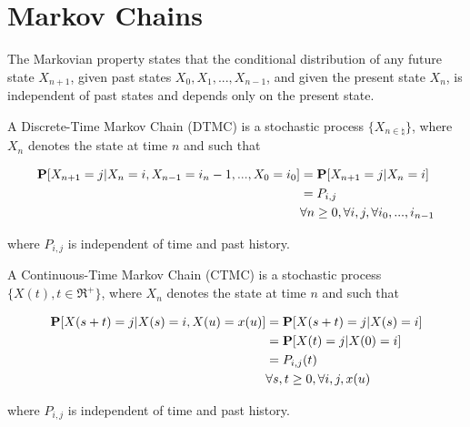 \section{Markov Chains}
\label{sec:markov-chains}

\begin{definition}
\label{def:markovian-property}
	The Markovian property states that the conditional distribution of any future state $X_{n+1}$, given past states $X_{0},X_{1},...,X_{n-1}$, and given the present state $X_{n}$, is independent of past states and depends only on the present state.
\end{definition}

\begin{definition}
\label{def:discrete-time-markov-chain}

	A Discrete-Time Markov Chain (DTMC) is a stochastic process $\{X_{n \in \natural}\}$, where $X_{n}$ denotes the state at time $n$ and such that
	
	\begin{equation}
	\label{eqn:discrete-time-markov-chain}
		\begin{split}	
			\probability{X_{n+1} = j | X_{n} = i,X_{n-1} = i_{n}-1,...,X_{0} = i_{0}}
			& = \probability{X_{n+1} = j | X_{n} = i} \\
			& = P_{i,j} \\
			& \forall n \geq 0, \forall i,j, \forall i_{0},...,i_{n-1}
		\end{split}		
	\end{equation}
	
	where $P_{i,j}$ is independent of time and past history.
\end{definition}

\begin{definition}
\label{def:continuous-time-markov-chain}
	
	A Continuous-Time Markov Chain (CTMC) is a stochastic process $\{X(t),t \in \Re^{+}\}$, where $X_{n}$ denotes the state at time $n$ and such that
	
	\begin{equation}
	\label{eqn:continuous-time-markov-chain}
		\begin{split}	
			\probability{X(s+t) = j | X(s) = i,X(u) = x(u)} 
			& = \probability{X(s+t) = j | X(s) = i} \\
			& = \probability{X(t) = j | X(0) = i} \\
			& = P_{i,j}(t) \\
			& \forall s,t \geq 0, \forall i,j,x(u) 
		\end{split}		
	\end{equation}
	
	where $P_{i,j}$ is independent of time and past history.
\end{definition}

